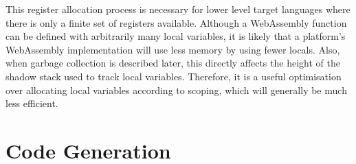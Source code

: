 This register allocation process is necessary for lower level target languages where there is only a finite set of registers available. Although a WebAssembly function can be defined with arbitrarily many local variables, it is likely that a platform's WebAssembly implementation will use less memory by using fewer locals. Also, when garbage collection is described later, this directly affects the height of the shadow stack used to track local variables. Therefore, it is a useful optimisation over allocating local variables according to scoping, which will generally be much less efficient.




\section{Code Generation}

